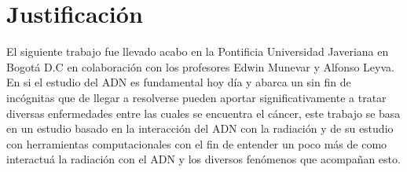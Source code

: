 \clearpage

\section{Justificación}
\label{sec:Intro}
El siguiente trabajo fue llevado acabo en la Pontificia Universidad Javeriana en Bogotá D.C en colaboración con los profesores Edwin Munevar y Alfonso Leyva. En si el estudio del ADN es fundamental hoy día y abarca un sin fin de incógnitas que de llegar a resolverse pueden aportar significativamente a tratar diversas enfermedades entre las cuales se encuentra el cáncer, este trabajo se basa en un estudio basado en la interacción del ADN con la radiación y de su estudio con herramientas computacionales con el fin de entender un poco más de como interactuá la radiación con el ADN y los diversos fenómenos que acompañan esto.
